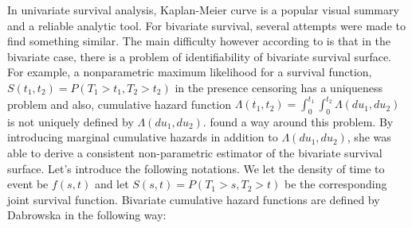 \documentclass[]{article}
\begin{document}
In univariate survival analysis, Kaplan-Meier curve is a popular visual summary and a reliable analytic tool. For bivariate survival, several attempts were made to find something similar. The main difficulty however according to \cite{kalbfleisch2011statistical} is that in the bivariate case, there is a problem of identifiability of bivariate survival surface. For example, a nonparametric maximum likelihood for a survival function, $S(t_1, t_2) = P(T_1>t_1, T_2>t_2)$ in the presence censoring has a uniqueness problem and also, cumulative hazard function $\Lambda(t_1, t_2) = \int_0^{t_1}\int_0^{t_2}\Lambda(du_1,du_2)$ is not uniquely defined by $\Lambda(du_1,du_2)$.  \cite{dabrowska1988kaplan} found a way around this problem. By introducing marginal cumulative hazards in addition to $\Lambda(du_1,du_2)$, she was able to derive a consistent non-parametric estimator of the bivariate survival surface. Let's introduce the following notations. We let the density of time to event be $f(s,t)$ and let $S(s,t) = P(T_1>s, T_2>t)$ be the corresponding joint survival function. Bivariate cumulative hazard functions are defined by Dabrowska in the following way:
\end{document}
